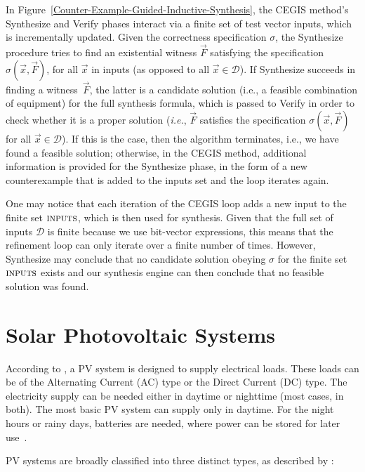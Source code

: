 In Figure~\ref{Counter-Example-Guided-Inductive-Synthesis}, the  CEGIS method's {\sc Synthesize} and {\sc Verify} phases interact via a finite set of test vector {\sc inputs}, which is incrementally updated. Given the correctness specification $\sigma$, the {\sc Synthesize} procedure tries to find an existential witness $\vec{F}$ satisfying the specification $\sigma(\vec{x}, \vec{F})$, for all $\vec{x}$ in {\sc inputs} (as opposed to all $\vec{x} \in \mathcal{D}$). If {\sc Synthesize} succeeds in finding a witness~$\vec{F}$, the latter is a candidate solution (i.e., a feasible combination of equipment) for the full synthesis formula, which is passed to {\sc Verify} in order to check whether it is a proper solution ({\it i.e.}, $\vec{F}$ satisfies the specification $\sigma(\vec{x}, \vec{F})$ for all $\vec{x}\in\mathcal{D}$). If this is the case, then the algorithm terminates, i.e., we have found a feasible solution; otherwise, in the CEGIS method, additional information is provided for the {\sc Synthesize} phase, in the form of a new counterexample that is added to the {\sc inputs} set and the loop iterates again.

One may notice that each iteration of the CEGIS loop adds a new input to the finite set $\text{\sc inputs}$, which is then used for synthesis.  Given that the full set of inputs $\mathcal{D}$ is finite because we use bit-vector expressions, this means that the refinement loop can only iterate over a finite number of times. However, {\sc Synthesize} may conclude that no candidate solution obeying $\sigma$ for the finite set $\text{\sc inputs}$ exists and our synthesis engine can then conclude that no feasible solution was found.

\section{Solar Photovoltaic Systems}

According to \cite{Roy}, a PV system is designed to supply electrical loads. These loads can be of the Alternating Current (AC) type or the Direct Current (DC) type. The electricity supply can be needed either in daytime or nighttime (most cases, in both). The most basic PV system can supply only in daytime.  For the night hours or rainy days, batteries are needed, where power can be stored for later use~\cite{Gules}. 

PV systems are broadly classified into three distinct types, as described by \cite{Mohanty}: 

